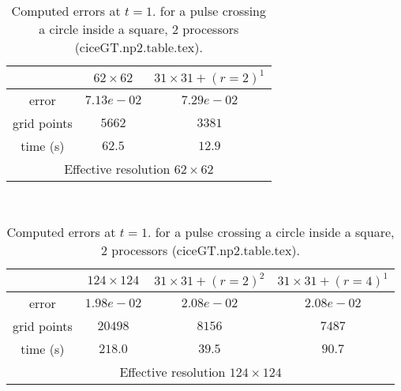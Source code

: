 \begin{table}[hbt]
\footnotesize
\begin{center}
\begin{tabular}{|c|c|c|}  \hline 
            & $62\times 62$  & $31\times31+ (r=2)^1$  \\   \hline 
 error      & $7.13e-02$     & $7.29e-02$  \\  
grid points & $5662$   &   $3381$     \\ 
time (s)    & $62.5$   &  $12.9$      \\ 
 \hline 
 \multicolumn{3}{c}{Effective resolution $62\times62$} \\ 
 \end{tabular}  \\ 
\vspace{.25\baselineskip}
\begin{tabular}{|c|c|c|c|}                   \hline 
       &  $124\times 124$ & $31\times31+ (r=2)^2$ & $31\times31+ (r=4)^1$  \\   \hline 
 error       & $1.98e-02$      & $2.08e-02$  & $2.08e-02$  \\  
 grid points &  $20498$  &  $8156$      &  $ 7487$      \\ 
 time (s)    &    $218.0$        &   $39.5$           &  $90.7$   \\ 
  \hline 
 \multicolumn{4}{c}{Effective resolution $124\times124$}  \\   
 \end{tabular}  
 \end{center}  
 \caption{Computed errors at $t=1.$ for a pulse crossing a circle inside a square, 2 processors (ciceGT.np2.table.tex).}  
 \label{tab:amrh.ciceGT}  
 \end{table}  
